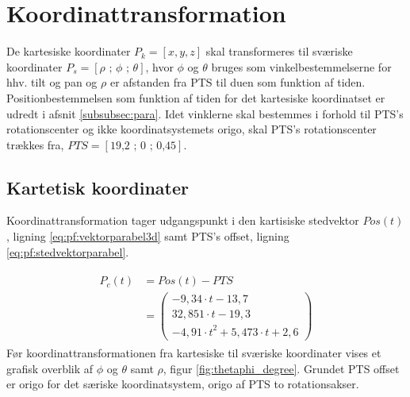 \section{Koordinattransformation}
\label{sec:koordinattransformation}

De kartesiske koordinater \(P_k=[x, y, z]\) skal transformeres til sværiske koordinater \(P_s=[\rho \text{ ; } \phi \text{ ; } \theta]\), hvor \(\phi\) og \(\theta\) bruges som vinkelbestemmelserne for hhv. tilt og pan og \(\rho\) er afstanden fra PTS til duen som funktion af tiden.
Positionbestemmelsen som funktion af tiden for det kartesiske koordinatset er udredt i afsnit \ref{subsubsec:para}.
Idet vinklerne skal bestemmes i forhold til PTS's rotationscenter og ikke koordinatsystemets origo, skal PTS's rotationscenter trækkes fra, \(PTS=[\text{19,2 ; 0 ; 0,45}]\). 
\subsection{Kartetisk koordinater}
Koordinattransformation tager udgangspunkt i den kartisiske stedvektor \(Pos(t) \), ligning \ref{eq:pf:vektorparabel3d} samt PTS's offset, ligning \ref{eq:pf:stedvektorparabel}.




\begin{align}
\begin{split}
{ P }_{ c }\left( t \right) &=Pos\left( t \right) -PTS
\\
&= \left( \begin{matrix} - 9,34\cdot t-13,7 \\
  32,851\cdot t-19,3 \\ 
 -{ 4,91\cdot t }^{ 2 }+5,473\cdot t+2,6\end{matrix} \right) 
\label{eq:pf:stedvektorparabel}
\end{split}
\end{align}
Før koordinattransformationen fra kartesiske til sværiske koordinater vises et grafisk overblik af \(\phi\) og \(\theta\) samt \(\rho\), figur \ref{fig:thetaphi_degree}. Grundet PTS offset er origo for det særiske koordinatsystem, origo af PTS to rotationsakser. 

